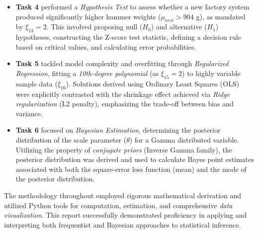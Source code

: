 \begin{itemize}
    \item \textbf{Task 4} performed a \emph{Hypothesis Test} to assess whether a new factory system produced significantly higher hammer weights ($\mu_{new} > 904$ g), as mandated by $\xi_{13}=2$. This involved proposing null ($H_0$) and alternative ($H_1$) hypotheses, constructing the Z-score test statistic, defining a decision rule based on critical values, and calculating error probabilities.
    \item \textbf{Task 5} tackled model complexity and overfitting through \emph{Regularized Regression}, fitting a \emph{10th-degree polynomial} (as $\xi_{15}=2$) to highly variable sample data ($\xi_{16}$). Solutions derived using Ordinary Least Squares (OLS) were explicitly contrasted with the shrinkage effect achieved via \emph{Ridge regularization} (L2 penalty), emphasizing the trade-off between bias and variance.
    \item \textbf{Task 6} focused on \emph{Bayesian Estimation}, determining the posterior distribution of the scale parameter ($\theta$) for a Gamma distributed variable. Utilizing the property of \emph{conjugate priors} (Inverse Gamma family), the posterior distribution was derived and used to calculate Bayes point estimates associated with both the square-error loss function (mean) and the mode of the posterior distribution.
\end{itemize}
The methodology throughout employed rigorous mathematical derivation and utilized Python tools for computation, estimation, and comprehensive \emph{data visualization}. This report successfully demonstrated proficiency in applying and interpreting both frequentist and Bayesian approaches to statistical inference.